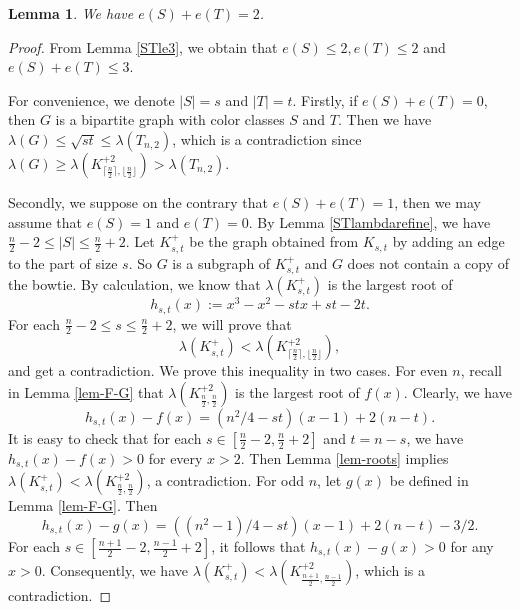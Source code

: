 \documentclass[11pt]{article}
\newtheorem{lemma}[theorem]{Lemma}
\begin{document}
\begin{lemma} \label{lem-EST2}
We have $e(S) + e(T) = 2$. 
\end{lemma}


\begin{proof}
From Lemma \ref{STle3}, 
we obtain that $e(S) \le 2,e(T)\le 2$ and 
$e(S) +e(T) \le 3$. 

For convenience, we denote 
$|S|=s$ and $|T|=t$. 
Firstly, if $e(S) + e(T)=0$, 
then $G$ is a bipartite graph with color classes $S$ and $T$. 
Then we have $\lambda (G)\le \sqrt{st} 
\le \lambda (T_{n,2})$, which is a contradiction since  
$\lambda (G) \ge 
\lambda (K_{\lceil \frac{n}{2} \rceil, \lfloor \frac{n}{2} \rfloor}^{+2}) > \lambda (T_{n,2})$. 

Secondly, we suppose on the contrary that 
 $e(S)+e(T)=1$, then we may assume that  
$e(S)=1$ and $ e(T)=0$. 
By Lemma \ref{STlambdarefine}, 
we have $\frac{n}{2} -2 \le |S| \le \frac{n}{2} +2$.  
Let $K_{s,t}^+$ be the graph obtained from 
$K_{s,t}$ by adding an edge to the part of size $s$. 
So $G$ is a subgraph of $K_{s,t}^+$ and 
$G$ does not contain a copy of the bowtie. 
By calculation, we know that 
$\lambda (K_{s,t}^+)$ is the largest root of 
\[  h_{s,t}(x) := x^3 - x^2 -s t x + s t - 2 t . \]
For each $\frac{n}{2} -2 \le s\le \frac{n}{2} +2$, 
we will prove that 
 \[  \lambda (K_{s, t}^{+}) < 
\lambda (K_{\lceil \frac{n}{2} \rceil, \lfloor \frac{n}{2} \rfloor}^{+2}), \]
and get a contradiction.   
We prove this inequality in two cases. 
For even $n$, 
recall in Lemma  \ref{lem-F-G} that $\lambda 
(K_{\frac{n}{2},\frac{n}{2}}^{+2})$ 
is the largest root of $f(x)$. 
Clearly, we have 
\[  h_{s,t}(x) - f(x)= 
(n^2/4 - st)(x-1)+2(n-t).  \]
It is easy to check that for each $s\in[ \frac{n}{2} -2, \frac{n}{2} +2]$ and $t=n-s$, we have 
$h_{s,t}(x) - f(x) >0$ for every $x> {2}$.  
Then Lemma \ref{lem-roots}  
implies $\lambda (K_{s,t}^+) < \lambda 
(K_{\frac{n}{2},\frac{n}{2}}^{+2})$, 
a contradiction. 
For odd $n$, let $g(x)$ be defined in Lemma \ref{lem-F-G}. Then 
\[  h_{s,t}(x) - g(x) = ((n^2-1)/4 - st)(x-1) + 
2(n-t) - 3/2.    \]
For each $s\in [\frac{n+1}{2} - 2, \frac{n-1}{2} +2]$, 
it follows that $h_{s,t}(x) - g(x) >0$ for any $x>0$. 
Consequently, we have $\lambda (K_{s,t}^+) < \lambda (K_{ \frac{n+1}{2}, \frac{n-1}{2}}^{+2})$, 
which is a contradiction. 


\end{proof}
\end{document}
